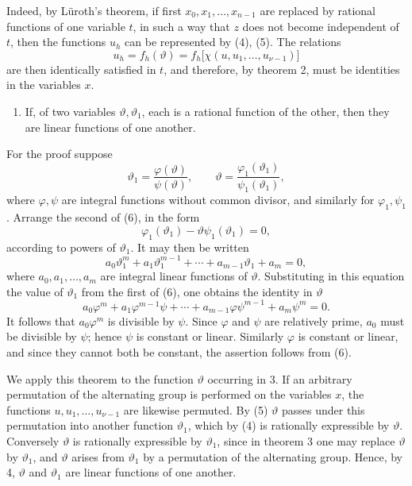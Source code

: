 \documentclass[11pt]{article}
\begin{document}
Indeed, by Lüroth's theorem, if first \(x_0,x_1,\ldots,x_{n-1}\) are replaced by rational functions of one variable \(t\), in such a way that \(z\) does not become independent of \(t\), then the functions \(u_h\) can be represented by (4), (5). The relations
\[
u_h=f_h(\vartheta)=f_h\bigl[\chi(u,u_1,\ldots,u_{\nu-1})\bigr]
\]
are then identically satisfied in \(t\), and therefore, by theorem 2, must be identities in the variables \(x\).

\begin{enumerate}[label=\arabic*.,start=4]
\item If, of two variables \(\vartheta,\vartheta_1\), each is a rational function of the other, then they are linear functions of one another.
\end{enumerate}

For the proof suppose
\begin{equation}
\vartheta_1=\frac{\varphi(\vartheta)}{\psi(\vartheta)},
\qquad
\vartheta=\frac{\varphi_1(\vartheta_1)}{\psi_1(\vartheta_1)},
\tag{6}
\end{equation}
where \(\varphi,\psi\) are integral functions without common divisor, and similarly for \(\varphi_1,\psi_1\). Arrange the second of (6), in the form
\[
\varphi_1(\vartheta_1)-\vartheta\psi_1(\vartheta_1)=0,
\]
according to powers of \(\vartheta_1\). It may then be written
\[
a_0\vartheta_1^m+a_1\vartheta_1^{m-1}+\cdots+a_{m-1}\vartheta_1+a_m=0,
\]
where \(a_0,a_1,\ldots,a_m\) are integral linear functions of \(\vartheta\). Substituting in this equation the value of \(\vartheta_1\) from the first of (6), one obtains the identity in \(\vartheta\)
\[
a_0\varphi^m+a_1\varphi^{m-1}\psi+\cdots+a_{m-1}\varphi\psi^{m-1}+a_m\psi^m=0.
\]
It follows that \(a_0\varphi^m\) is divisible by \(\psi\). Since \(\varphi\) and \(\psi\) are relatively prime, \(a_0\) must be divisible by \(\psi\); hence \(\psi\) is constant or linear. Similarly \(\varphi\) is constant or linear, and since they cannot both be constant, the assertion follows from (6).

We apply this theorem to the function \(\vartheta\) occurring in 3. If an arbitrary permutation of the alternating group is performed on the variables \(x\), the functions \(u,u_1,\ldots,u_{\nu-1}\) are likewise permuted. By (5) \(\vartheta\) passes under this permutation into another function \(\vartheta_1\), which by (4) is rationally expressible by \(\vartheta\). Conversely \(\vartheta\) is rationally expressible by \(\vartheta_1\), since in theorem 3 one may replace \(\vartheta\) by \(\vartheta_1\), and \(\vartheta\) arises from \(\vartheta_1\) by a permutation of the alternating group. Hence, by 4, \(\vartheta\) and \(\vartheta_1\) are linear functions of one another.
\end{document}
